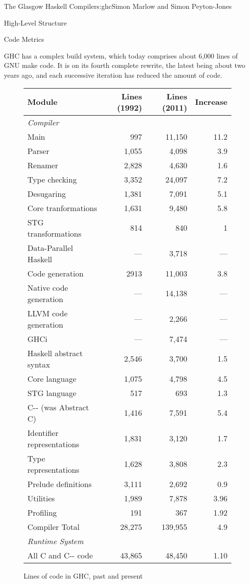 \begin{aosachapter}{The Glasgow Haskell Compiler}{s:ghc}{Simon Marlow and Simon Peyton-Jones}
\begin{aosasect1}{High-Level Structure}
\begin{aosasect2}{Code Metrics}
\begin{aosaitemize}
\item GHC has a complex build system, which today comprises about
  6,000 lines of GNU make code.  It is on its fourth complete rewrite,
  the latest being about two years ago, and each successive iteration
  has reduced the amount of code.

\end{aosaitemize}

\begin{figure}
\begin{tabular}{|lrrr|}
\hline
Module & Lines (1992) & Lines (2011) & Increase \\
\hline
\multicolumn{4}{|l|}{\emph{Compiler}} \\
Main    & 997 & 11,150 & 11.2 \\
Parser  & 1,055 & 4,098 & 3.9 \\
Renamer & 2,828 & 4,630 & 1.6 \\
Type checking & 3,352 & 24,097 & 7.2 \\
Desugaring & 1,381 & 7,091 & 5.1 \\
Core tranformations & 1,631 & 9,480 & 5.8 \\
STG transformations & 814 & 840 & 1 \\
Data-Parallel Haskell & --- & 3,718 & --- \\
Code generation & 2913 & 11,003 & 3.8 \\
Native code generation & --- & 14,138 & --- \\
LLVM code generation & --- & 2,266 & --- \\
GHCi & --- & 7,474 & --- \\
Haskell abstract syntax & 2,546 & 3,700 & 1.5 \\
Core language & 1,075 & 4,798 & 4.5 \\
STG language & 517 & 693 & 1.3 \\
C{-}{-} (was Abstract C)  & 1,416 & 7,591 & 5.4 \\
Identifier representations & 1,831 & 3,120 & 1.7 \\
Type representations & 1,628 & 3,808 & 2.3 \\
Prelude definitions & 3,111 & 2,692 & 0.9 \\
Utilities & 1,989 & 7,878 & 3.96 \\
Profiling & 191 & 367 & 1.92 \\
\hline
Compiler Total  & 28,275 & 139,955 & 4.9 \\ \hline
\hline
\multicolumn{4}{|l|}{\emph{Runtime System}} \\
All C and C{-}{-} code & 43,865 & 48,450 & 1.10 \\
\hline
\end{tabular}
\caption{Lines of code in GHC, past and present} \label{f:lines}
\end{figure}


\end{aosasect2}
\end{aosasect1}
\end{aosachapter}
